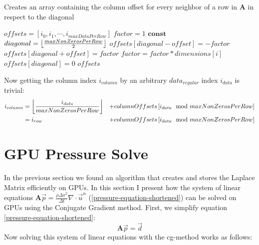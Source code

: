 \begin{algorithm}
\caption{Creates an array containing the column offset for every neighbor of a row in \textbf{A} in respect to the diagonal}\label{diagonalOffsets}
\begin{algorithmic}[1]
	\State $offsets = \left[ i_0, i_1, \cdots, i_{maxDataPerRow} \right]$  
	\State $factor = 1$
	\State $\mathbf{const}$ $diagonal = \floor*{\frac{maxNonZerosPerRow}{2}}$
	\State 
    	\State $offsets[diagonal - offset] = -factor$
        \State $offsets[diagonal + offset] = factor$
        \State $factor = factor * dimensions[i]$
	\EndFor
	\State $offsets[diagonal] = 0$
	\State \Return $offsets$
	
\EndFunction
\end{algorithmic}
\end{algorithm}
Now getting the column index $i_{column}$ by an arbitrary $data_{regular}$ index $i_{data}$ is trivial:
\begin{equation}
\begin{aligned}
	i_{column} & = \floor*{\frac{i_{data}}{maxNonZerosPerRow}} & + columnOffsets\left[ i_{data} \mod maxNonZerosPerRow \right]\\
			   & = i_{row} & + columnOffsets\left[ i_{data} \mod maxNonZerosPerRow \right]\\
\end{aligned}
\end{equation}

\section{GPU Pressure Solve}
In the previous section we found an algorithm that creates and stores the Laplace Matrix efficiently on GPUs. In this section I present how the system of linear equations $\mathbf{A}\vec{p} = \frac{\rho \Delta x^2}{\Delta t}\nabla \cdot \vec{u}^n$ (\ref{pressure-equation-shortened}) can be solved on GPUs using the Conjugate Gradient method. First, we simplify equation \ref{pressure-equation-shortened}:
\begin{equation}
	\mathbf{A}\vec{p} = \vec{d} 
\end{equation}
Now solving this system of linear equations with the cg-method works as follows:

